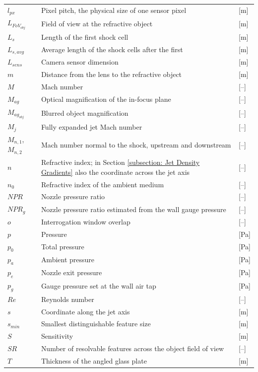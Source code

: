 \begin{longtable}{p{2.5cm}p{8cm}p{2.5cm}}
    $l_{px}$ & Pixel pitch, the physical size of one sensor pixel & [m] \\
    $L_{FoV_{obj}}$ & Field of view at the refractive object & [m] \\
    $L_s$ & Length of the first shock cell & [m] \\
    $L_{s,avg}$ & Average length of the shock cells after the first & [m] \\
    $L_{sens}$ & Camera sensor dimension & [m] \\
    $m$ & Distance from the lens to the refractive object & [m] \\
    $M$ & Mach number & [--] \\
    $M_{ag}$ & Optical magnification of the in-focus plane & [--] \\
    $M_{ag_{obj}}$ & Blurred object magnification & [--] \\
    $M_j$ & Fully expanded jet Mach number & [--] \\
    $M_{n,1}$, $M_{n,2}$ & Mach number normal to the shock, upstream and downstream & [--] \\
    $n$ & Refractive index; in Section \ref{subsection: Jet Density Gradients} also the coordinate across the jet axis & [--] \\
    $n_0$ & Refractive index of the ambient medium & [--] \\
    $NPR$ & Nozzle pressure ratio & [--] \\
    $NPR_g$ & Nozzle pressure ratio estimated from the wall gauge pressure & [--] \\
    $o$ & Interrogation window overlap & [--] \\
    $p$ & Pressure & [Pa] \\
    $p_0$ & Total pressure & [Pa] \\
    $p_a$ & Ambient pressure & [Pa] \\
    $p_e$ & Nozzle exit pressure & [Pa] \\
    $p_g$ & Gauge pressure set at the wall air tap & [Pa] \\
    $Re$ & Reynolds number & [--] \\
    $s$ & Coordinate along the jet axis & [m] \\
    $s_{min}$ & Smallest distinguishable feature size & [m] \\
    $S$ & Sensitivity & [m] \\
    $SR$ & Number of resolvable features across the object field of view & [--] \\
    $T$ & Thickness of the angled glass plate & [m] \\

\end{longtable}

